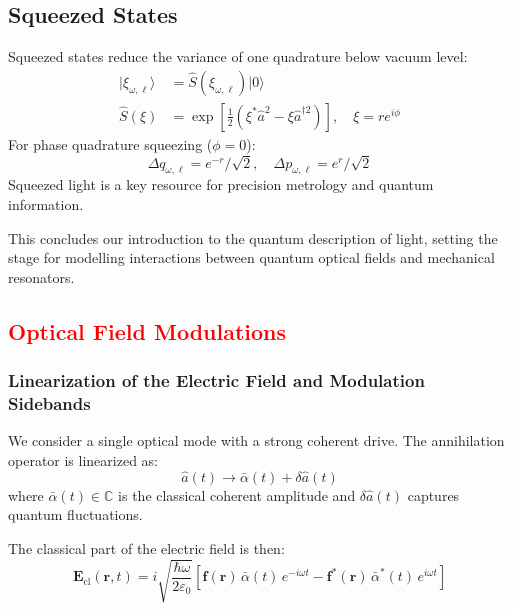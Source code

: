 \subsection*{Squeezed States}

Squeezed states reduce the variance of one quadrature below vacuum level:
\begin{align}
|\xi_{\omega,\ell}\rangle &= \hat{S}(\xi_{\omega,\ell}) |0\rangle \\
\hat{S}(\xi) &= \exp\left[\frac{1}{2}(\xi^* \hat{a}^2 - \xi \hat{a}^{\dagger 2})\right], \quad \xi = r e^{i\phi}
\end{align}
For phase quadrature squeezing ($\phi = 0$):
\begin{equation}
\Delta q_{\omega,\ell} = e^{-r}/\sqrt{2}, \quad \Delta p_{\omega,\ell} = e^{r}/\sqrt{2}
\end{equation}
Squeezed light is a key resource for precision metrology and quantum information.


\vspace{1em}
This concludes our introduction to the quantum description of light, setting the stage for modelling interactions between quantum optical fields and mechanical resonators.

\subsection{\textcolor{red}{Optical Field Modulations}}
\subsubsection*{Linearization of the Electric Field and Modulation Sidebands}

We consider a single optical mode with a strong coherent drive. The annihilation operator is linearized as:
\begin{equation}
    \hat{a}(t) \to \bar{\alpha}(t) + \delta \hat{a}(t)
\end{equation}
where $\bar{\alpha}(t) \in \mathbb{C}$ is the classical coherent amplitude and $\delta \hat{a}(t)$ captures quantum fluctuations.

The classical part of the electric field is then:
\begin{equation}
    \mathbf{E}_{\text{cl}}(\mathbf{r}, t) = i \sqrt{\frac{\hbar \omega}{2 \varepsilon_0}} \left[
    \mathbf{f}(\mathbf{r})\, \bar{\alpha}(t)\, e^{-i \omega t}
    - \mathbf{f}^*(\mathbf{r})\, \bar{\alpha}^*(t)\, e^{i \omega t}
    \right]
\end{equation}

